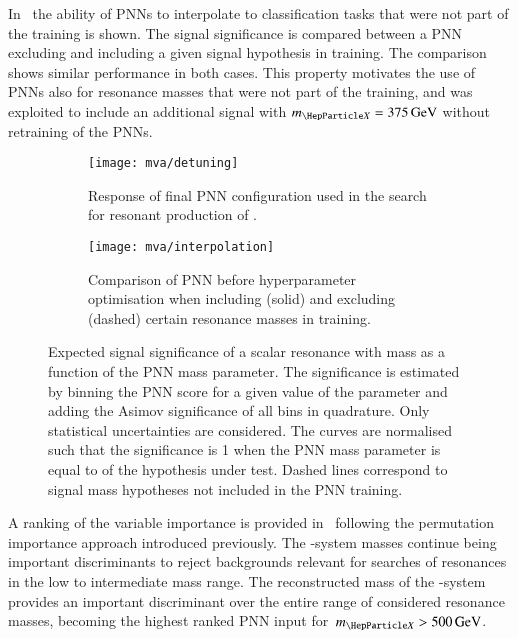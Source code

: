 In~ the ability of PNNs to interpolate to
classification tasks that were not part of the training is shown. The
signal significance is compared between a PNN excluding and including
a given signal hypothesis in training. The comparison shows similar
performance in both cases. This property motivates the use of PNNs
also for resonance masses that were not part of the training, and was
exploited to include an additional signal with $\mX = \SI{375}{\GeV}$
without retraining of the PNNs. %

\begin{figure}[htbp]
  \centering

  \begin{subfigure}[t]{.49\textwidth}
    \texttt{[image: mva/detuning]}
    \caption{Response of final PNN configuration used in the search
      for resonant production of \HH.}
    \label{fig:pnn_detuning}
  \end{subfigure}\hfill%
  \begin{subfigure}[t]{.49\textwidth}
    \centering
    \texttt{[image: mva/interpolation]}
    \caption{Comparison of PNN before hyperparameter optimisation when
      including (solid) and excluding (dashed) certain resonance
      masses in training.}
    \label{fig:pnn_interpolation}
  \end{subfigure}

  \caption{Expected signal significance of a scalar resonance with
    mass \mX as a function of the PNN mass parameter. The significance
    is estimated by binning the PNN score for a given value of the
    parameter and adding the Asimov significance of all bins in
    quadrature. Only statistical uncertainties are considered. The
    curves are normalised such that the significance is 1 when the PNN
    mass parameter is equal to \mX of the hypothesis under
    test. Dashed lines correspond to signal mass hypotheses not
    included in the PNN training.}
  \label{fig:pnn_properties}
\end{figure}

A ranking of the variable importance is provided
in~ following the permutation importance
approach introduced previously. The \PHiggs-system masses continue
being important discriminants to reject backgrounds relevant for
searches of resonances in the low to intermediate mass range. The
reconstructed mass of the \HH-system provides an important
discriminant over the entire range of considered resonance masses,
becoming the highest ranked PNN input for~$\mX > \SI{500}{\GeV}$.

